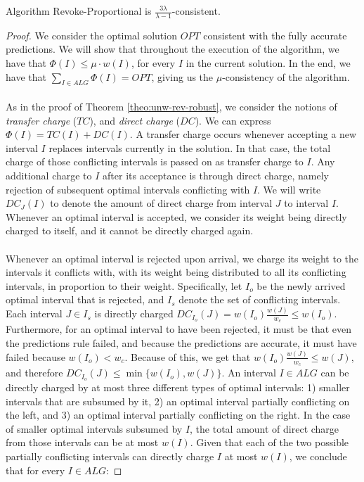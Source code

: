 \begin{theorem}
    Algorithm Revoke-Proportional is $\frac{3\lambda}{\lambda -1}$-consistent.\label{theo:prop-consistent}
\end{theorem}
\begin{proof}
We consider the optimal solution $OPT$ consistent with the fully accurate predictions. We will show that throughout the execution of the algorithm, we have that $\Phi(I) \leq \mu \cdot w(I)$, for every $I$ in the current solution. In the end, we have that $\sum_{I\in ALG} \Phi(I) = OPT$, giving us the $\mu$-consistency of the algorithm.\\\\
As in the proof of Theorem \ref{theo:unw-rev-robust}, we consider the notions of \textit{transfer charge} ($TC$), and \textit{direct charge} ($DC$). We can express $\Phi(I) = TC(I) + DC(I)$. A transfer charge occurs whenever accepting a new interval $I$ replaces intervals currently in the solution. In that case, the total charge of those conflicting intervals is passed on as transfer charge to $I$. Any additional charge to $I$ after its acceptance is through direct charge, namely rejection of subsequent optimal intervals conflicting with $I$. We will write $DC_J(I)$ to denote the amount of direct charge from interval $J$ to interval $I$. Whenever an optimal interval is accepted, we consider its weight being directly charged to itself, and it cannot be directly charged again.\\\\
Whenever an optimal interval is rejected upon arrival, we charge its weight to the intervals it conflicts with, with its weight being distributed to all its conflicting intervals, in proportion to their weight. Specifically, let $I_o$ be the newly arrived optimal interval that is rejected, and $I_s$ denote the set of conflicting intervals. Each interval $J \in I_s$ is directly charged $DC_{I_o}(J)=w(I_o) \frac{w(J)}{w_c}\leq w(I_o)$. Furthermore, for an optimal interval to have been rejected, it must be that even the predictions rule failed, and because the predictions are accurate, it must have failed because $w(I_o) < w_c$. Because of this, we get that $w(I_o) \frac{w(J)}{w_c} \leq w(J)$, and therefore $DC_{I_o}(J)\leq\min\{w(I_o),w(J)\}$. An interval $I \in ALG$ can be directly charged by at most three different types of optimal intervals: 1) smaller intervals that are subsumed by it, 2) an optimal interval partially conflicting on the left, and 3) an optimal interval partially conflicting on the right.
In the case of smaller optimal intervals subsumed by $I$, the total amount of direct charge from those intervals can be at most $w(I)$. Given that each of the two possible partially conflicting intervals can directly charge $I$ at most $w(I)$, we conclude that for every $I\in ALG$:

\end{proof}
